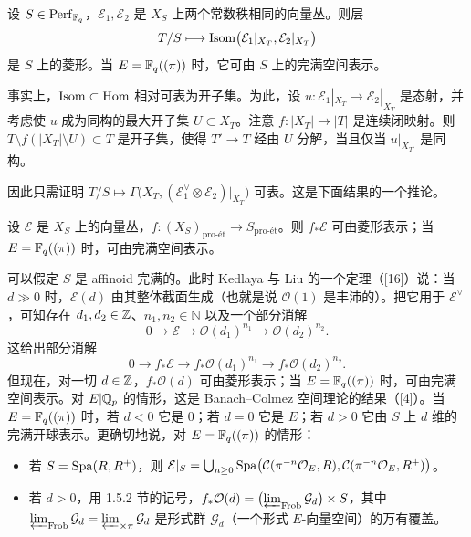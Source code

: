 \begin{proposition}\label{prop:2.4}
设 $S\in \mathrm{Perf}_{\mathbb{F}_q}$，$\mathcal{E}_1,\mathcal{E}_2$ 是 $X_S$ 上两个常数秩相同的向量丛。则层
\[
T/S\longmapsto \operatorname{Isom}\bigl(\mathcal{E}_1|_{X_T},\mathcal{E}_2|_{X_T}\bigr)
\]
是 $S$ 上的菱形。当 $E=\mathbb{F}_q((\pi))$ 时，它可由 $S$ 上的完满空间表示。
\end{proposition}

事实上，$\operatorname{Isom}\subset \mathrm{Hom}$ 相对可表为开子集。为此，设 $u:\mathcal{E}_1|_{X_T}\to \mathcal{E}_2|_{X_T}$ 是态射，并考虑使 $u$ 成为同构的最大开子集 $U\subset X_T$。注意 $f:|X_T|\to |T|$ 是连续闭映射。则 $T\setminus f(|X_T|\setminus U)\subset T$ 是开子集，使得 $T'\to T$ 经由 $U$ 分解，当且仅当 $u|_{X_{T'}}$ 是同构。

因此只需证明 $T/S\mapsto \Gamma\bigl(X_T,(\mathcal{E}_1^\vee\otimes \mathcal{E}_2)|_{X_T}\bigr)$ 可表。这是下面结果的一个推论。

\begin{proposition}\label{prop:2.5}
设 $\mathcal{E}$ 是 $X_S$ 上的向量丛，$f:(X_S)_{\text{pro-ét}}\to S_{\text{pro-ét}}$。则 $f_*\mathcal{E}$ 可由菱形表示；当 $E=\mathbb{F}_q((\pi))$ 时，可由完满空间表示。
\end{proposition}

可以假定 $S$ 是 affinoid 完满的。此时 Kedlaya 与 Liu 的一个定理（[16]）说：当 $d\gg0$ 时，$\mathcal{E}(d)$ 由其整体截面生成（也就是说 $\mathcal{O}(1)$ 是丰沛的）。把它用于 $\mathcal{E}^\vee$，可知存在 $d_1,d_2\in\mathbb{Z}$、$n_1,n_2\in\mathbb{N}$ 以及一个部分消解
\[
0\longrightarrow \mathcal{E}\longrightarrow \mathcal{O}(d_1)^{n_1}\longrightarrow \mathcal{O}(d_2)^{n_2}.
\]
这给出部分消解
\[
0\longrightarrow f_*\mathcal{E}\longrightarrow f_*\mathcal{O}(d_1)^{n_1}\longrightarrow f_*\mathcal{O}(d_2)^{n_2}.
\]
但现在，对一切 $d\in\mathbb{Z}$，$f_*\mathcal{O}(d)$ 可由菱形表示；当 $E=\mathbb{F}_q((\pi))$ 时，可由完满空间表示。对 $E|\mathbb{Q}_p$ 的情形，这是 Banach–Colmez 空间理论的结果（[4]）。当 $E=\mathbb{F}_q((\pi))$ 时，若 $d<0$ 它是 $0$；若 $d=0$ 它是 $E$；若 $d>0$ 它由 $S$ 上 $d$ 维的完满开球表示。更确切地说，对 $E=\mathbb{F}_q((\pi))$ 的情形：

\begin{itemize}
\item 若 $S=\mathrm{Spa}(R,R^+)$，则 $\mathcal{E}|_S=\bigcup_{n\ge0}\mathrm{Spa}\bigl(\mathcal{C}(\pi^{-n}\mathcal{O}_E,R),\mathcal{C}(\pi^{-n}\mathcal{O}_E,R^+)\bigr)$。
\item 若 $d>0$，用 1.5.2 节的记号，$f_*\mathcal{O}(d)=\bigl(\varprojlim_{\mathrm{Frob}}\mathcal{G}_d\bigr)\times S$，其中 $\varprojlim_{\mathrm{Frob}}\mathcal{G}_d=\varprojlim_{\times\pi}\mathcal{G}_d$ 是形式群 $\mathcal{G}_d$（一个形式 $E$-向量空间）的万有覆盖。
\end{itemize}

